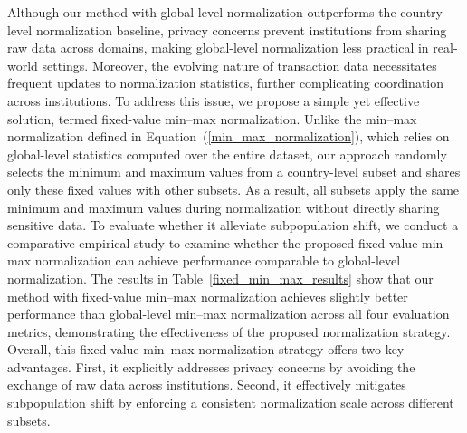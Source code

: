\documentclass[11pt,english]{article}
\begin{document}
Although our method with global-level normalization outperforms the country-level normalization baseline, privacy concerns prevent institutions from sharing raw data across domains, making global-level normalization less practical in real-world settings. Moreover, the evolving nature of transaction data necessitates frequent updates to normalization statistics, further complicating coordination across institutions. To address this issue, we propose a simple yet effective solution, termed fixed-value min–max normalization. Unlike the min–max normalization defined in Equation~(\ref{min_max_normalization}), which relies on global-level statistics computed over the entire dataset, our approach randomly selects the minimum and maximum values from a country-level subset and shares only these fixed values with other subsets. As a result, all subsets apply the same minimum and maximum values during normalization without directly sharing sensitive data. To evaluate whether it alleviate subpopulation shift, we conduct a comparative empirical study to examine whether the proposed fixed-value min–max normalization can achieve performance comparable to global-level normalization. The results in Table~\ref{fixed_min_max_results} show that our method with fixed-value min–max normalization achieves slightly better performance than global-level min–max normalization across all four evaluation metrics, demonstrating the effectiveness of the proposed normalization strategy. Overall, this fixed-value min–max normalization strategy offers two key advantages. First, it explicitly addresses privacy concerns by avoiding the exchange of raw data across institutions. Second, it effectively mitigates subpopulation shift by enforcing a consistent normalization scale across different subsets. 
\end{document}
